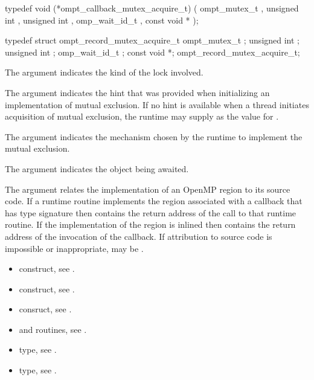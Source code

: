 \format
\begin{ccppspecific}
\begin{omptCallback}
typedef void (*ompt_callback_mutex_acquire_t) (
  ompt_mutex_t ,
  unsigned int ,
  unsigned int ,
  omp_wait_id_t ,
  const void *
);
\end{omptCallback}
\end{ccppspecific}

\record
\begin{ccppspecific}
\begin{omptRecord}
typedef struct ompt_record_mutex_acquire_t {
  ompt_mutex_t ;
  unsigned int ;
  unsigned int ;
  omp_wait_id_t ;
  const void *;
} ompt_record_mutex_acquire_t;
\end{omptRecord}
\end{ccppspecific}

\argdesc
The  argument indicates the kind of the lock involved.

The  argument indicates the hint that was provided when initializing
an implementation of mutual exclusion. If no hint is available when a thread 
initiates acquisition of mutual exclusion, the runtime may supply 
 as the value for .

The  argument indicates the mechanism chosen by the runtime to implement 
the mutual exclusion.

The  argument indicates the object being awaited.

The  argument relates the implementation of an OpenMP region
to its source code. If a runtime routine implements the region associated with
a callback that has type signature  then
 contains the return address of the call to that runtime routine.
If the implementation of the region is inlined then  contains the
return address of the invocation of the callback. If attribution to source code
is impossible or inappropriate, may be .

\crossreferences
\begin{itemize}
\item {} construct, see .

\item {} construct, see .

\item {} consruct, see .

\item {} and  routines,
see .

\item {} type, see .

\item {} type, see .
\end{itemize}



